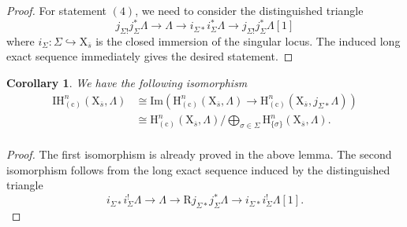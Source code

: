 \documentclass[10pt]{amsart}
\numberwithin{equation}{section}
\newtheorem{corollary}[equation]{Corollary}
\theoremstyle{definition}
\def\rmc{\mathrm{c}}
\def\rmH{\mathrm{H}}
\def\rmR{\mathrm{R}}
\def\rmX{\mathrm{X}}
\begin{document}
\begin{proof}
For statement $(4)$, we need to consider the distinguished triangle
\begin{equation*}
j_{\Sigma!}j^{\ast}_{\Sigma}\Lambda\rightarrow \Lambda \rightarrow i_{\Sigma\ast}i^{\ast}_{\Sigma}\Lambda\rightarrow j_{\Sigma!}j^{\ast}_{\Sigma}\Lambda[1]
\end{equation*}
where $i_{\Sigma}:\Sigma\hookrightarrow \rmX_{\overline{s}}$ is the closed immersion of the singular locus. The induced long exact sequence immediately gives the desired statement.
\end{proof}

\begin{corollary}\label{intersection}
We have the following isomorphism
\begin{equation*}
\begin{aligned}
\mathrm{IH}^{n}_{(\rmc)}(\rmX_{\overline{s}}, \Lambda)&\cong\mathrm{Im}(\mathrm{H}^{n}_{(\rmc)}(\rmX_{\overline{s}}, \Lambda)\rightarrow \mathrm{H}^{n}_{(\rmc)}(\rmX_{\overline{s}}, j_{\Sigma\ast}\Lambda))\\
&\cong\mathrm{H}^{n}_{(\rmc)}(\rmX_{\overline{s}}, \Lambda)/\bigoplus\limits_{\sigma\in\Sigma}\rmH^{n}_{\{\sigma\}}(\rmX_{\overline{s}}, \Lambda).\\
\end{aligned}
\end{equation*}
\end{corollary}
\begin{proof}
The first isomorphism is already proved in the above lemma. The second isomorphism follows from the long exact sequence induced by the distinguished triangle
\begin{equation*}
i_{\Sigma\ast}i^{!}_{\Sigma}\Lambda\rightarrow \Lambda\rightarrow \rmR j_{\Sigma\ast}j^{\ast}_{\Sigma}\Lambda\rightarrow i_{\Sigma\ast}i^{!}_{\Sigma}\Lambda[1].
\end{equation*}
\end{proof}
\end{document}
